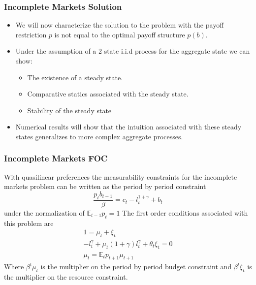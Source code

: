 \documentclass{beamer}
\newcommand{\EE}{\mathbb E}
\begin{document}
\begin{frame}
	\frametitle{Incomplete Markets Solution}
	\begin{itemize}
		\item  We will now characterize the solution to the problem with the payoff restriction $p$ is not equal to the optimal payoff structure $p(b)$. 
		\item  Under the assumption of a 2 state i.i.d process for the aggregate state we can show:
		\begin{itemize}
			\item  The existence of a steady state.
			\item  Comparative statics associated with the steady state.
			\item  Stability of the steady state
		\end{itemize}
		\item  Numerical results will show that the intuition associated with these steady states generalizes to more complex aggregate processes.
	\end{itemize}
\end{frame}  
  
\begin{frame}
 	\frametitle{Incomplete Markets FOC}
	With quasilinear preferences the measurability constraints for the incomplete markets problem can be written as the period by period constraint
	\[
		\frac{p_t b_{t-1}}\beta = c_t - l_t^{1+\gamma} + b_t 
	\]under the normalization of $\EE_{t-1} p_t = 1$  The first order conditions associated with this problem are
	\begin{align*}
		1 = \mu_t + \xi_t\\
		-l_t^\gamma+\mu_t(1+\gamma)l_t^\gamma+\theta_t\xi_t = 0\\
		\mu_t = \EE_t p_{t+1}\mu_{t+1}
	\end{align*}  Where $\beta^t\mu_t$ is the multiplier on the period by period budget constraint and $\beta^t\xi_t$ is the multiplier on the resource constraint.
\end{frame}
\end{document}
